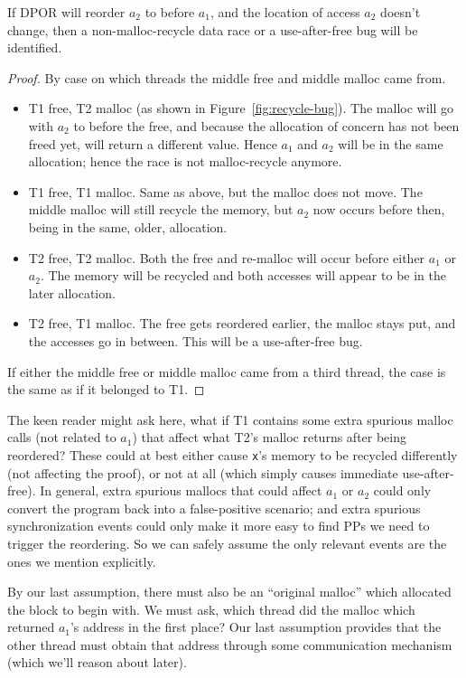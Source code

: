 \begin{lemma}
	If DPOR will reorder $a_2$ to before $a_1$, and the location of access $a_2$ doesn't change,
	then a non-malloc-recycle data race or a use-after-free bug will be identified.
	\label{lem:reorder}
\end{lemma}
\begin{proof}
By case on which threads the middle free and middle malloc came from.
\begin{itemize}
	\item T1 free, T2 malloc (as shown in Figure~\ref{fig:recycle-bug}). The malloc will go with $a_2$ to before the free, and because the allocation of concern has not been freed yet, will return a different value. Hence $a_1$ and $a_2$ will be in the same allocation; hence the race is not malloc-recycle anymore.
	\item T1 free, T1 malloc. Same as above, but the malloc does not move. The middle malloc will still recycle the memory, but $a_2$ now occurs before then, being in the same, older, allocation.
	\item T2 free, T2 malloc. Both the free and re-malloc will occur before either $a_1$ or $a_2$. The memory will be recycled and both accesses will appear to be in the later allocation.
	\item T2 free, T1 malloc. The free gets reordered earlier, the malloc stays put, and the accesses go in between. This will be a use-after-free bug.
\end{itemize}
If either the middle free or middle malloc came from a third thread, the case is the same as if it belonged to T1.
\end{proof}

The keen reader might ask here, what if T1 contains some extra spurious malloc calls (not related to $a_1$) that affect what T2's malloc returns after being reordered?
These could at best either cause {\tt x}'s memory to be recycled differently (not affecting the proof), or not at all (which simply causes immediate use-after-free).
In general, extra spurious mallocs that could affect $a_1$ or $a_2$ could only convert the program back into a false-positive scenario;
and extra spurious synchronization events could only make it more easy to find PPs we need to trigger the reordering.
So we can safely assume the only relevant events are the ones we mention explicitly.

By our last assumption, there must also be an ``original malloc'' which allocated the block to begin with.
We must ask, which thread did the malloc which returned $a_1$'s address in the first place?
Our last assumption provides that the other thread must obtain that address through some communication mechanism (which we'll reason about later).

